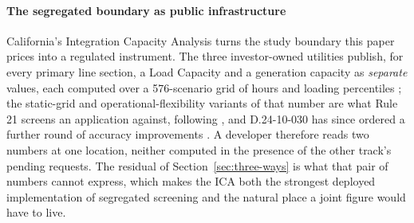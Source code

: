 \documentclass[review,authoryear,12pt]{elsarticle}
\begin{document}
\paragraph{The segregated boundary as public infrastructure}
California's Integration Capacity Analysis turns the study boundary this paper
prices into a regulated instrument. The three
investor-owned utilities publish, for every primary
line section, a Load Capacity and a generation capacity as \emph{separate}
values, each computed over a 576-scenario grid of hours and loading percentiles
\citep{pge_grip2024}; the static-grid and operational-flexibility variants of
that number are what Rule 21 screens an application against, following
\citet{cpuc_lgp2020}, and D.24-10-030 has since ordered a further round of
accuracy improvements \citep{cpuc_ica2024}. A developer therefore reads two
numbers at one location, neither computed in the presence of the other track's
pending requests. The residual of Section~\ref{sec:three-ways} is what that
pair of numbers cannot express, which makes the ICA both the strongest deployed
implementation of segregated screening and the natural place a joint figure
would have to live.
\end{document}
